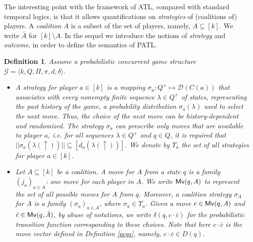\documentclass[times, 10 pt,twocolumn]{article}
\newtheorem{definition}[theorem]{Definition}{\bfseries}{\rm}
\newcommand{\mc}[1]{\mathcal{#1}}
\begin{document}
The interesting point with the framework of ATL, compared with
standard temporal logics, is that it allows quantifications on
\emph{strategies} of (coalitions of) players. A \emph{coalition}
$A$ is a subset of the set of players, namely, $A\subseteq [k]$.
We write $\bar{A}$ for $[k]\setminus A$. In the sequel we
introduce the notions of \emph{strategy} and \emph{outcome}, in
order to define the semantics of PATL.

\begin{definition} Assume a probabilistic concurrent game
structure $\mc{G}=\langle k, Q, \Pi, \pi, d, \delta \rangle$.
\begin{itemize}
  \item A \emph{strategy} for player $a\in [k]$ is a mapping
  $\sigma_a: Q^+\mapsto \mc{D}(C(a))$ that associates with every
  nonempty finite sequence $\lambda\in Q^+$ of states,
  representing the past history of the game, a \emph{probability
  distribution} $\sigma_a(\lambda)$ used to select the next move.
  Thus, the choice of the next move can be \emph{history-dependent} and
  \emph{randomized}. The strategy $\sigma_a$ can prescribe only moves that
  are available to player $a$, i.e. for all sequences $\lambda\in
  Q^+$ and $q\in Q$, it is required that $||\sigma_a(\lambda(\uparrow))||\subseteq [d_a(\lambda(\uparrow))]$. %
  We denote by $\Upsilon_a$ the set of all
  strategies for player $a\in [k]$.

  \item Let $A\subseteq [k]$ be a coalition. A \emph{move} for
  $A$ from a state $q$ is a family $(j_a)_{a\in A}$: one move
  for each player in $A$. We write ${\rm \sf Mv}(q, A)$ to represent the set
  of all possible moves for $A$ from $q$. Moreover, a \emph{coalition
  strategy} $\sigma_A$ for $A$ is a family $(\sigma_a)_{a\in A}$, where $\sigma_a\in \Upsilon_a$.
  Given a move $c\in
  {\rm \sf Mv}(q, A)$ and $\bar{c}\in {\rm \sf Mv}(q, \bar{A})$,
  by abuse of notations, we write $\delta(q, c\cdot \bar{c})$ for the probabilistic
  transition function corresponding to these choices. Note that here $c\cdot \bar{c}$ is the
  \emph{move vector} defined in Definition \ref{pcgs}, namely, $c\cdot \bar{c}\in D(q)$.


\end{itemize}
\end{definition}
\end{document}
